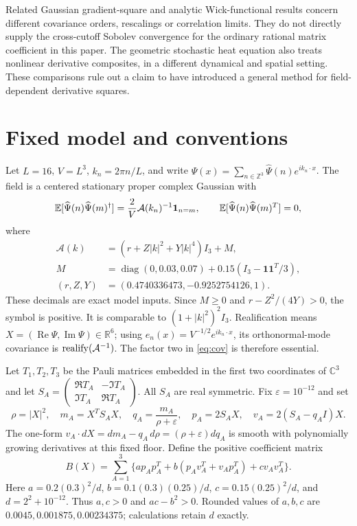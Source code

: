 \documentclass[11pt]{article}
\newcommand{\E}{\mathbb E}
\newcommand{\R}{\mathbb R}
\newcommand{\C}{\mathbb C}
\newcommand{\eps}{\varepsilon}
\begin{document}
Related Gaussian gradient-square and analytic Wick-functional results
\cite{CRS,CHRR} concern different covariance orders, rescalings or
correlation limits. They do not directly supply the cross-cutoff Sobolev
convergence for the ordinary rational matrix coefficient in this paper.
The geometric stochastic heat equation \cite{BGHZ} also treats nonlinear
derivative composites, in a different dynamical and spatial setting.
These comparisons rule out a claim to have introduced a general method
for field-dependent derivative squares.

\section{Fixed model and conventions}
Let $L=16$, $V=L^3$, $k_n=2\pi n/L$, and write
$\Psi(x)=\sum_{n\in\mathbb Z^3}\widehat\Psi(n)e^{ik_n\cdot x}$.
The field is a centered stationary proper complex Gaussian with
\begin{equation}\label{eq:cov}
 \E[\widehat\Psi(n)\widehat\Psi(m)^\dagger]
 =\frac{2}{V}{\cal A}(k_n)^{-1}\mathbf1_{n=m},\qquad
 \E[\widehat\Psi(n)\widehat\Psi(m)^T]=0,
\end{equation}
where
\begin{align}
 \mathcal A(k)&=(r+Z|k|^2+Y|k|^4)I_3+M,\label{eq:symbol}\\
 M&=\operatorname{diag}(0,0.03,0.07)
       +0.15(I_3-\bm1\bm1^T/3),\nonumber\\
 (r,Z,Y)&=(0.4740336473,-0.9252754126,1).\nonumber
\end{align}
These decimals are exact model inputs. Since $M\ge0$ and
$r-Z^2/(4Y)>0$, the symbol is positive. It is comparable to
$(1+|k|^2)^2I_3$. Realification means
$X=(\operatorname{Re}\Psi,\operatorname{Im}\Psi)\in\R^6$;
using $e_n(x)=V^{-1/2}e^{ik_n\cdot x}$, its orthonormal-mode covariance is $\operatorname{realify}({\cal A}^{-1})$.
The factor two in \eqref{eq:cov} is therefore essential.

Let $T_1,T_2,T_3$ be the Pauli matrices embedded in the first two coordinates
of $\C^3$ and let
$S_A=\left(\begin{smallmatrix}\Re T_A&-\Im T_A\\\Im T_A&\Re T_A\end{smallmatrix}\right)$.
All $S_A$ are real symmetric. Fix $\eps=10^{-12}$ and set
\begin{equation}\label{eq:oneform}
 \rho=|X|^2,\quad m_A=X^TS_AX,\quad q_A=\frac{m_A}{\rho+\eps},
 \quad p_A=2S_AX,\quad v_A=2(S_A-q_AI)X.
\end{equation}
The one-form $v_A\cdot dX=dm_A-q_A\,d\rho=(\rho+\eps)dq_A$
is smooth with polynomially growing derivatives at this fixed floor.
Define the positive coefficient matrix
\begin{equation}\label{eq:B}
 B(X)=\sum_{A=1}^3\{a p_Ap_A^T+b(p_Av_A^T+v_Ap_A^T)+c v_Av_A^T\}.
\end{equation}
Here $a=0.2(0.3)^2/d$, $b=0.1(0.3)(0.25)/d$,
$c=0.15(0.25)^2/d$, and $d=2^2+10^{-12}$.
Thus $a,c>0$ and $ac-b^2>0$. Rounded values of $a,b,c$ are
$0.0045,0.001875,0.00234375$; calculations retain $d$ exactly.
\end{document}
